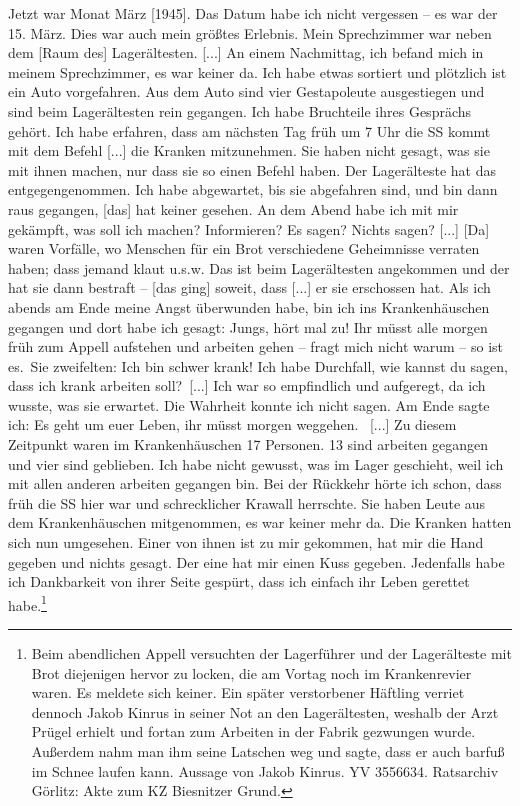 \documentclass[a4paper,12pt,ngerman,
]{nisebook}
\begin{document}
\label{widerstand_kinrus}
\begin{leftbar}
Jetzt war Monat März [1945]. Das Datum habe ich nicht vergessen -- es war der 15. März. Dies war auch mein größtes Erlebnis. \newline
Mein Sprechzimmer war neben dem [Raum des] Lagerältesten. [...] An einem Nachmittag, ich befand mich in meinem Sprechzimmer, es war keiner da. Ich habe etwas sortiert und plötzlich ist ein Auto vorgefahren. Aus dem Auto sind vier Gestapoleute ausgestiegen und sind beim Lager\-ältesten rein gegangen. Ich habe Bruchteile ihres Gesprächs gehört. Ich habe erfahren, dass am nächsten Tag früh um 7 Uhr die SS kommt mit dem Befehl [...] die Kranken mitzunehmen. Sie haben nicht gesagt, was sie mit ihnen machen, nur dass sie so einen Befehl haben. Der Lager\-älteste hat das entgegengenommen. Ich habe abgewartet, bis sie abgefahren sind, und bin dann raus gegangen, [das] hat keiner gesehen. An dem Abend habe ich mit mir gekämpft, was soll ich machen? Informieren? Es sagen? Nichts sagen? [...] [Da] waren Vorfälle, wo Menschen für ein Brot verschiedene Geheimnisse verraten haben; dass jemand klaut u.s.w. Das ist beim Lager\-ältesten angekommen und der hat sie dann bestraft -- [das ging] soweit, dass [...] er sie erschossen hat. Als ich abends am Ende meine Angst überwunden habe, bin ich ins Krankenhäuschen gegangen und dort habe ich gesagt: \glqq Jungs, hört mal zu! Ihr müsst alle morgen früh zum Appell aufstehen und arbeiten gehen -- fragt mich nicht warum -- so ist es.\grqq~Sie zweifelten: \glqq Ich bin schwer krank! Ich habe Durchfall, wie kannst du sagen, dass ich krank arbeiten soll?\grqq~[...] Ich war so empfindlich und aufgeregt, da ich wusste, was sie erwartet. Die Wahrheit konnte ich nicht sagen. Am Ende sagte ich: \glqq Es geht um euer Leben, ihr müsst morgen weggehen.\grqq~
[...] Zu diesem Zeitpunkt waren im Krankenhäuschen 17 Personen. 13 sind arbeiten gegangen und vier sind geblieben. Ich habe nicht gewusst, was im Lager geschieht, weil ich mit allen anderen arbeiten gegangen bin. Bei der Rückkehr hörte ich schon, dass früh die SS hier war und schrecklicher Krawall herrschte. Sie haben Leute aus dem Krankenhäuschen mitgenommen, es war keiner mehr da. Die Kranken hatten sich nun umgesehen. Einer von ihnen ist zu mir gekommen, hat mir die Hand gegeben und nichts gesagt. Der eine hat mir einen Kuss gegeben. Jedenfalls habe ich Dankbarkeit von ihrer Seite gespürt, dass ich einfach ihr Leben gerettet habe.\footnote{Beim abendlichen Appell versuchten der Lager\-führer und der Lager\-älteste mit Brot diejenigen hervor zu locken, die am Vortag noch im Krankenrevier waren. Es meldete sich keiner. Ein später verstorbener Häftling verriet dennoch Jakob Kinrus in seiner Not an den Lager\-ältesten, weshalb der Arzt Prügel erhielt und fortan zum Arbeiten in der Fabrik gezwungen wurde. Außerdem nahm man ihm seine Latschen weg und sagte, dass er auch barfuß im Schnee laufen kann. Aussage von Jakob Kinrus. YV 3556634. Ratsarchiv Görlitz: Akte zum KZ Biesnitzer Grund.}
\end{leftbar}
\end{document}
